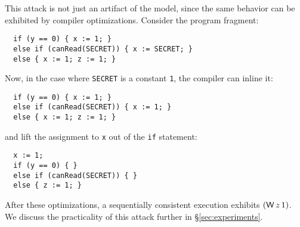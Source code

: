 This attack is not just an artifact of the model,
since the same behavior can be exhibited by
compiler optimizations. Consider the program fragment:
\begin{verbatim}
  if (y == 0) { x := 1; }
  else if (canRead(SECRET)) { x := SECRET; }
  else { x := 1; z := 1; }
\end{verbatim}
Now, in the case where \verb|SECRET| is a constant \verb|1|,
the compiler can inline it:
\begin{verbatim}
  if (y == 0) { x := 1; }
  else if (canRead(SECRET)) { x := 1; }
  else { x := 1; z := 1; }
\end{verbatim}
and lift the assignment to \verb|x| out of the \verb|if| statement:
\begin{verbatim}
  x := 1;
  if (y == 0) { }
  else if (canRead(SECRET)) { }
  else { z := 1; }
\end{verbatim}
After these optimizations, a sequentially consistent execution
exhibits $(\DW{z}{1})$. We discuss the practicality of this attack
further in \S\ref{sec:experiments}.

